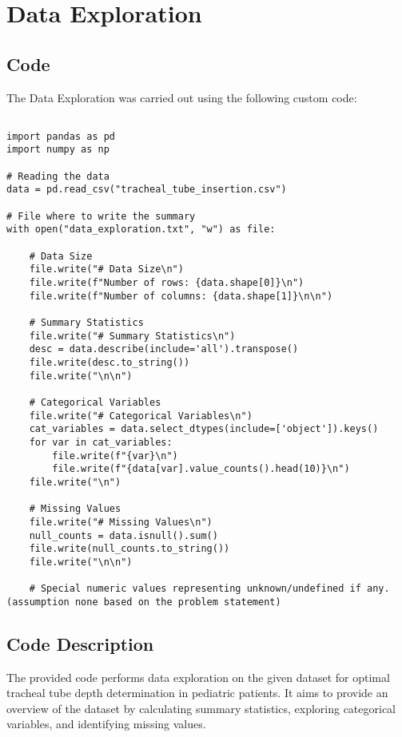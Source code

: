 \documentclass[11pt]{article}
\begin{document}
\section{Data Exploration}
\subsection{{Code}}
The Data Exploration was carried out using the following custom code:

\begin{verbatim}

import pandas as pd
import numpy as np

# Reading the data
data = pd.read_csv("tracheal_tube_insertion.csv")

# File where to write the summary
with open("data_exploration.txt", "w") as file:

    # Data Size
    file.write("# Data Size\n")
    file.write(f"Number of rows: {data.shape[0]}\n")
    file.write(f"Number of columns: {data.shape[1]}\n\n")

    # Summary Statistics
    file.write("# Summary Statistics\n")
    desc = data.describe(include='all').transpose()
    file.write(desc.to_string())
    file.write("\n\n")
    
    # Categorical Variables
    file.write("# Categorical Variables\n")
    cat_variables = data.select_dtypes(include=['object']).keys()
    for var in cat_variables:
        file.write(f"{var}\n")
        file.write(f"{data[var].value_counts().head(10)}\n")
    file.write("\n")
     
    # Missing Values
    file.write("# Missing Values\n")
    null_counts = data.isnull().sum()
    file.write(null_counts.to_string())
    file.write("\n\n")
    
    # Special numeric values representing unknown/undefined if any. (assumption none based on the problem statement)

\end{verbatim}

\subsection{Code Description}

The provided code performs data exploration on the given dataset for optimal tracheal tube depth determination in pediatric patients. It aims to provide an overview of the dataset by calculating summary statistics, exploring categorical variables, and identifying missing values.
\end{document}
